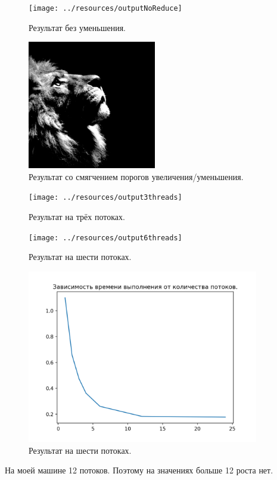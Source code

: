 \begin{figure}[ht]
    \begin{center}
        \texttt{[image: ../resources/outputNoReduce]}
    \end{center}
    \caption{Результат без уменьшения.}
\end{figure}

\begin{figure}[ht]
    \begin{center}
        \includegraphics[width=0.5\textwidth]{../resources/outputStrongUpgrade}
    \end{center}
    \caption{Результат со смягчением порогов увеличения/уменьшения.}
\end{figure}

\begin{figure}[ht]
    \begin{center}
        \texttt{[image: ../resources/output3threads]}
    \end{center}
    \caption{Результат на трёх потоках.}
\end{figure}

\begin{figure}[ht]
    \begin{center}
        \texttt{[image: ../resources/output6threads]}
    \end{center}
    \caption{Результат на шести потоках.}
\end{figure}

\begin{figure}[ht]
    \begin{center}
        \includegraphics[width=0.9\textwidth]{../resources/graph}
    \end{center}
    \caption{Результат на шести потоках.}
\end{figure}

На моей машине 12 потоков.
Поэтому на значениях больше 12 роста нет.